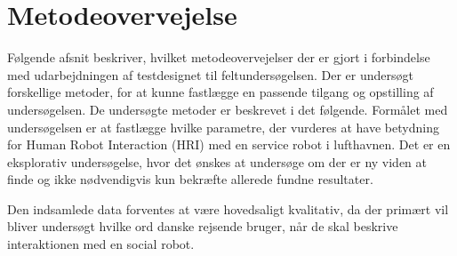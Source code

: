 \section{Metodeovervejelse}
\label{ParametreMetodeovervejelser}
%
Følgende afsnit beskriver, hvilket metodeovervejelser der er gjort i forbindelse med udarbejdningen af testdesignet til feltundersøgelsen. Der er undersøgt forskellige metoder, for at kunne fastlægge en passende tilgang og opstilling af undersøgelsen. De undersøgte metoder er beskrevet i det følgende. \blankline
%
Formålet med undersøgelsen er at fastlægge hvilke parametre, der vurderes at have betydning for Human Robot Interaction (HRI) med en service robot i lufthavnen. Det er en eksplorativ undersøgelse, hvor det ønskes at undersøge om der er ny viden at finde og ikke nødvendigvis kun bekræfte allerede fundne resultater. 

Den indsamlede data forventes at være hovedsaligt kvalitativ, da der primært vil bliver undersøgt hvilke ord danske rejsende bruger, når de skal beskrive interaktionen med en social robot. 
%


